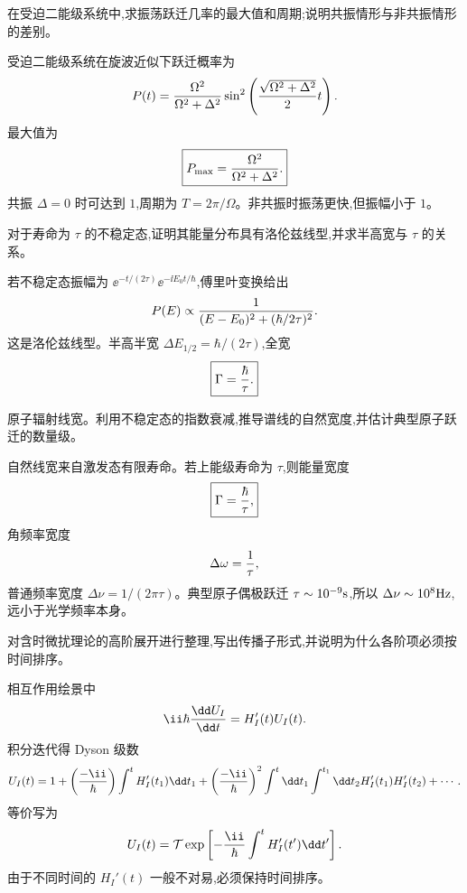 \begin{question}
在受迫二能级系统中,求振荡跃迁几率的最大值和周期;说明共振情形与非共振情形的差别。
\end{question}
\begin{solution}
受迫二能级系统在旋波近似下跃迁概率为
\[
P(t)={\Omega^2\over\Omega^2+\Delta^2}
\sin^2\left({\sqrt{\Omega^2+\Delta^2}\over2}t\right).
\]
最大值为
\[
\boxed{P_{\max}={\Omega^2\over\Omega^2+\Delta^2}.}
\]
共振 $\Delta=0$ 时可达到 $1$,周期为 $\boxed{T=2\pi/\Omega}$。非共振时振荡更快,但振幅小于 $1$。
\end{solution}

\begin{question}
对于寿命为 $\tau$ 的不稳定态,证明其能量分布具有洛伦兹线型,并求半高宽与 $\tau$ 的关系。
\end{question}
\begin{solution}
若不稳定态振幅为 $\ee^{-t/(2\tau)}\ee^{-\ii E_0t/\hbar}$,傅里叶变换给出
\[
P(E)\propto {1\over(E-E_0)^2+(\hbar/2\tau)^2}.
\]
这是洛伦兹线型。半高半宽 $\Delta E_{1/2}=\hbar/(2\tau)$,全宽
\[
\boxed{\Gamma={\hbar\over\tau}.}
\]
\end{solution}

\begin{question}
原子辐射线宽。利用不稳定态的指数衰减,推导谱线的自然宽度,并估计典型原子跃迁的数量级。
\end{question}
\begin{solution}
自然线宽来自激发态有限寿命。若上能级寿命为 $\tau$,则能量宽度
\[
\boxed{\Gamma={\hbar\over\tau},}
\]
角频率宽度
\[
\Delta\omega={1\over\tau},
\]
普通频率宽度 $\boxed{\Delta\nu=1/(2\pi\tau)}$。典型原子偶极跃迁 $\tau\sim10^{-9}{\rm s}$,所以 $\Delta\nu\sim10^8{\rm Hz}$,远小于光学频率本身。
\end{solution}

\begin{question}
对含时微扰理论的高阶展开进行整理,写出传播子形式,并说明为什么各阶项必须按时间排序。
\end{question}
\begin{solution}
相互作用绘景中
\[
\ii\hbar {\dd U_I\over\dd t}=H_I'(t)U_I(t).
\]
积分迭代得 Dyson 级数
\[
U_I(t)=1+\left({-\ii\over\hbar}\right)\int^t H_I'(t_1)\dd t_1
+\left({-\ii\over\hbar}\right)^2\int^t\dd t_1\int^{t_1}\dd t_2 H_I'(t_1)H_I'(t_2)+\cdots.
\]
等价写为
\[
U_I(t)=\mathcal T\exp\left[-{\ii\over\hbar}\int^t H_I'(t')\dd t'\right].
\]
由于不同时间的 $H_I'(t)$ 一般不对易,必须保持时间排序。
\end{solution}

